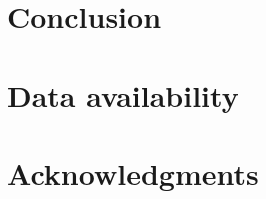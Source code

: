 \documentclass[hidelinks]{article}
\begin{document}

    






\section*{Conclusion}
    \label{conclusion}

\section*{Data availability}\label{data_availability}


\section*{Acknowledgments}\label{acknowledgements}
\end{document}
